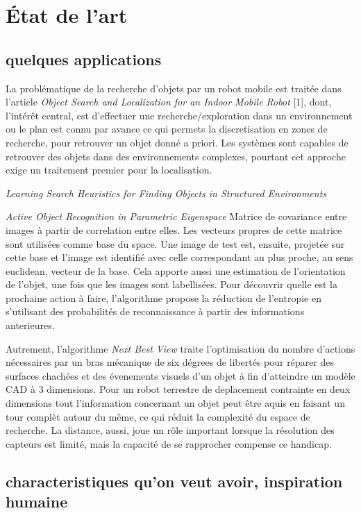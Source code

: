
{\color{green}

\section{État de l'art}
  
\subsection { quelques applications}
 La problématique de la recherche d'objets par un robot mobile est traitée dans l'article \textit{Object Search and Localization for an Indoor Mobile Robot} [1], dont, l'intérêt central, est d'effectuer une recherche/exploration dans un environnement ou le plan est connu par avance ce qui permets la discretisation en zones de recherche, pour retrouver un objet donné a priori. Les systèmes sont capables de retrouver des objets dans des environnements complexes, pourtant cet approche exige un traitement premier pour la localisation.

\textit{Learning Search Heuristics for Finding Objects in Structured Environments} 


\textit{Active Object Recognition in Parametric Eigenspace}
Matrice de covariance entre images à partir de correlation entre elles. Les vecteurs propres de cette matrice sont utilisées comme base du space. Une image de test est, ensuite, projetée sur cette base et l'image est identifié avec celle correspondant au plus proche, au sens euclidean, vecteur de la base. Cela apporte aussi une estimation de l'orientation de l'objet, une fois que les images sont labellisées. Pour découvrir quelle est la prochaine action à faire, l'algorithme propose la réduction de l'entropie en s'utilisant des probabilités de reconnaissance à partir des informations anterieures.
 
Autrement, l'algorithme \textit{Next Best View} traite l'optimisation du nombre d'actions nécessaires par un bras mécanique de six dégrees de libertés pour réparer des surfaces chachées et des évenements visuels d'un objet à fin d'atteindre un modèle CAD à 3 dimensions. Pour un robot terrestre de deplacement contrainte en deux dimensions tout l'information concernant un objet peut être aquis en faisant un tour complèt autour du même, ce qui réduit la complexité du espace de recherche. La distance, aussi, joue un rôle important lorsque la résolution des capteurs est limité, mais la capacité de se rapprocher compense ce handicap.

\subsection{characteristiques qu'on veut avoir, inspiration humaine}

}

